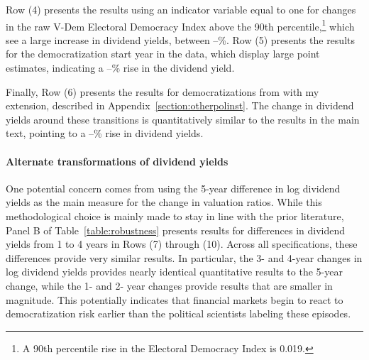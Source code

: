 \documentclass[12pt]{article}
\numberwithin{equation}{section}
\begin{document}
Row (4) presents the results using an indicator variable equal to one for changes in the raw V-Dem Electoral Democracy Index above the 90th percentile,\footnote{A 90th percentile rise in the Electoral Democracy Index is 0.019.} which see a large increase in dividend yields, between \tabBThreeLargeJumpLow\---\tabBThreeLargeJumpHigh\%. Row (5) presents the results for the democratization start year in the \cite{Lindberg2018} data, which display large point estimates, indicating a \tabBThreeLindbergLow\---\tabBThreeLindbergHigh\% rise in the dividend yield. 

Finally, Row (6) presents the results for democratizations from \cite{Acemoglu2019} with my extension, described in Appendix~\ref{section:otherpolinst}. The change in dividend yields around these transitions is quantitatively similar to the results in the main text, pointing to a \tabBThreeAcemogluLow\---\tabBThreeAcemogluHigh\% rise in dividend yields. 

\paragraph{Alternate transformations of dividend yields}
One potential concern comes from using the 5-year difference in log dividend yields as the main measure for the change in valuation ratios. While this methodological choice is mainly made to stay in line with the prior literature, Panel B of Table~\ref{table:robustness} presents results for differences in dividend yields from 1 to 4 years in Rows (7) through (10). Across all specifications, these differences provide very similar results. In particular, the 3- and 4-year changes in log dividend yields provides nearly identical quantitative results to the 5-year change, while the 1- and 2- year changes provide results that are smaller in magnitude. This potentially indicates that financial markets begin to react to democratization risk earlier than the political scientists labeling these episodes.
\end{document}

